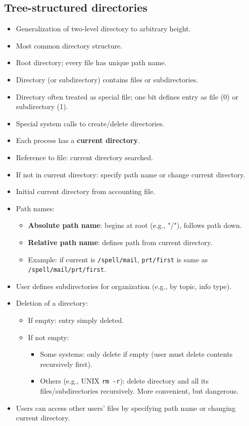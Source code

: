 \subsection{Tree-structured directories}
\begin{itemize}
    \item Generalization of two-level directory to arbitrary height.
    \item Most common directory structure.
    \item Root directory; every file has unique path name.
    \item Directory (or subdirectory) contains files or subdirectories.
    \item Directory often treated as special file; one bit defines entry as file (0) or subdirectory (1).
    \item Special system calls to create/delete directories.
    \item Each process has a \textbf{current directory}.
    \item Reference to file: current directory searched.
    \item If not in current directory: specify path name or change current directory.
    \item Initial current directory from accounting file.
    \item Path names:
    \begin{itemize}
        \item \textbf{Absolute path name}: begins at root (e.g., "/"), follows path down.
        \item \textbf{Relative path name}: defines path from current directory.
        \item Example: if current is \texttt{/spell/mail}, \texttt{prt/first} is same as \texttt{/spell/mail/prt/first}.
    \end{itemize}
    \item User defines subdirectories for organization (e.g., by topic, info type).
    \item Deletion of a directory:
    \begin{itemize}
        \item If empty: entry simply deleted.
        \item If not empty:
        \begin{itemize}
            \item Some systems: only delete if empty (user must delete contents recursively first).
            \item Others (e.g., UNIX \texttt{rm -r}): delete directory and all its files/subdirectories recursively. More convenient, but dangerous.
        \end{itemize}
    \end{itemize}
    \item Users can access other users' files by specifying path name or changing current directory.
\end{itemize}

